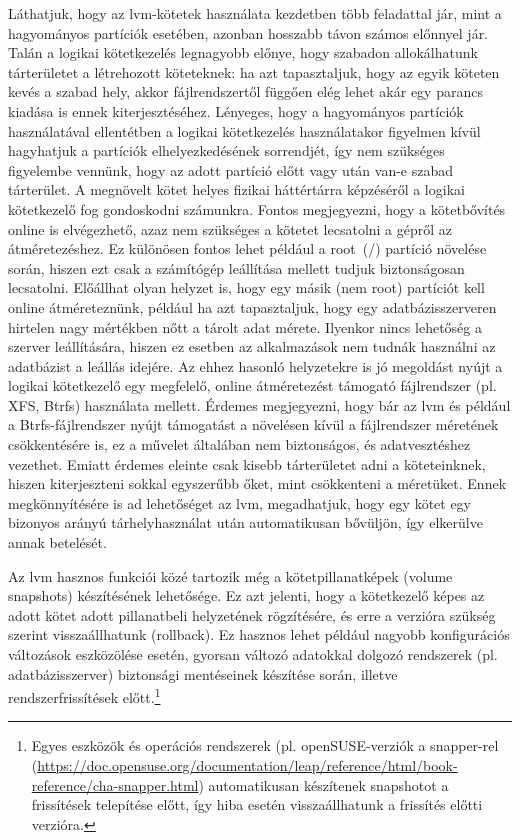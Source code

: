Láthatjuk, hogy az \acrshort{lvm}-kötetek használata kezdetben több feladattal jár, mint a hagyományos partíciók esetében, azonban hosszabb távon számos előnnyel jár. Talán a logikai kötetkezelés legnagyobb előnye, hogy szabadon allokálhatunk tárterületet a létrehozott köteteknek: ha azt tapasztaljuk, hogy az egyik köteten kevés a szabad hely, akkor fájlrendszertől függően elég lehet akár egy parancs kiadása is ennek kiterjesztéséhez. Lényeges, hogy a hagyományos partíciók használatával ellentétben a logikai kötetkezelés használatakor figyelmen kívül hagyhatjuk a partíciók elhelyezkedésének sorrendjét, így nem szükséges figyelembe vennünk, hogy az adott partíció előtt vagy után van-e szabad tárterület. A megnövelt kötet helyes fizikai háttértárra képzéséről a logikai kötetkezelő fog gondoskodni számunkra. Fontos megjegyezni, hogy a kötetbővítés online is elvégezhető, azaz nem szükséges a kötetet lecsatolni a gépről az átméretezéshez. Ez különösen fontos lehet például a root~(/) partíció növelése során, hiszen ezt csak a számítógép leállítása mellett tudjuk biztonságosan lecsatolni. Előállhat olyan helyzet is, hogy egy másik (nem root) partíciót kell online átméreteznünk, például ha azt tapasztaljuk, hogy egy adatbázisszerveren hirtelen nagy mértékben nőtt a tárolt adat mérete. Ilyenkor nincs lehetőség a szerver leállítására, hiszen ez esetben az alkalmazások nem tudnák használni az adatbázist a leállás idejére. Az ehhez hasonló helyzetekre is jó megoldást nyújt a logikai kötetkezelő egy megfelelő, online átméretezést támogató fájlrendszer (pl. XFS, Btrfs) használata mellett. Érdemes megjegyezni, hogy bár az \acrshort{lvm} és például a Btrfs-fájlrendszer nyújt támogatást a növelésen kívül a fájlrendszer méretének csökkentésére is, ez a művelet általában nem biztonságos, és adatvesztéshez vezethet. Emiatt érdemes eleinte csak kisebb tárterületet adni a köteteinknek, hiszen kiterjeszteni sokkal egyszerűbb őket, mint csökkenteni a méretüket. Ennek megkönnyítésére is ad lehetőséget az \acrshort{lvm}, megadhatjuk, hogy egy kötet egy bizonyos arányú tárhelyhasználat után automatikusan bővüljön, így elkerülve annak betelését.

Az \acrshort{lvm} hasznos funkciói közé tartozik még a kötetpillanatképek (volume snapshots) készítésének lehetősége. Ez azt jelenti, hogy a kötetkezelő képes az adott kötet adott pillanatbeli helyzetének rögzítésére, és erre a verzióra szükség szerint visszaállhatunk (rollback). Ez hasznos lehet például nagyobb konfigurációs változások eszközölése esetén, gyorsan változó adatokkal dolgozó rendszerek (pl. adatbázisszerver) biztonsági mentéseinek készítése során, illetve rendszerfrissítések előtt.\footnote{Egyes eszközök és operációs rendszerek (pl. openSUSE-verziók a snapper-rel (\url{https://doc.opensuse.org/documentation/leap/reference/html/book-reference/cha-snapper.html}) automatikusan készítenek snapshotot a frissítések telepítése előtt, így hiba esetén visszaállhatunk a frissítés előtti verzióra.}




